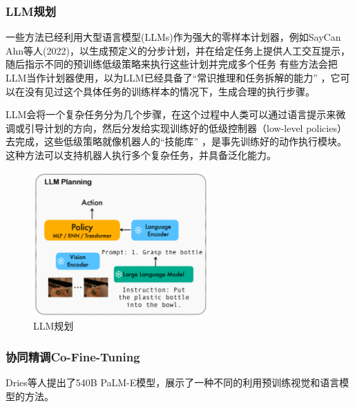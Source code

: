 \documentclass[12pt]{article}
\begin{document}
\subsubsection{LLM规划}
一些方法已经利用大型语言模型(LLMs)作为强大的零样本计划器，例如SayCan Ahn等人(2022)，以生成预定义的分步计划，并在给定任务上提供人工交互提示，随后指示不同的预训练低级策略来执行这些计划并完成多个任务
有些方法会把LLM当作计划器使用，以为LLM已经具备了“常识推理和任务拆解的能力” ，它可以在没有见过这个具体任务的训练样本的情况下，生成合理的执行步骤。

LLM会将一个复杂任务分为几个步骤，在这个过程中人类可以通过语言提示来微调或引导计划的方向，然后分发给实现训练好的低级控制器（low-level policies）去完成，这些低级策略就像机器人的“技能库” ，是事先训练好的动作执行模块。这种方法可以支持机器人执行多个复杂任务，并具备泛化能力。
\begin{figure}[ht]  %
\centering
\includegraphics[width=0.6\textwidth]{pic2.png}
\caption{LLM规划}
\end{figure}

\subsubsection{协同精调Co-Fine-Tuning}
Dries等人提出了540B PaLM-E模型，展示了一种不同的利用预训练视觉和语言模型的方法。
\end{document}
